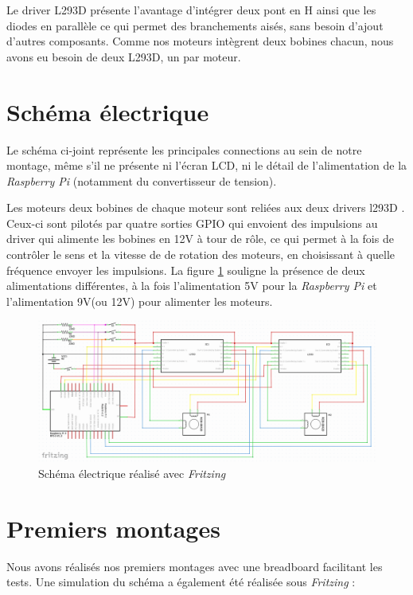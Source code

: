 \documentclass[12pt,a4paper]{report}
\begin{document}
Le driver L293D présente l'avantage d'intégrer deux pont en H ainsi que les diodes en parallèle ce qui permet des branchements aisés, sans besoin d'ajout d'autres composants. Comme nos moteurs intègrent deux bobines chacun, nous avons eu besoin de deux L293D, un par moteur.

\section{Schéma électrique}
Le schéma ci-joint représente les principales connections au sein de notre montage, même s'il ne présente ni l'écran LCD, ni le détail de l'alimentation de la \emph{Raspberry Pi} (notamment du convertisseur de tension).

Les moteurs deux bobines de chaque moteur sont reliées aux deux drivers l293D . Ceux-ci sont pilotés par quatre sorties GPIO qui envoient des impulsions au driver qui alimente les bobines en 12V à tour de rôle, ce qui permet à la fois de contrôler le sens et la vitesse de de rotation des moteurs, en choisissant à quelle fréquence envoyer les impulsions. La figure \ref{schema_elec} souligne la présence de deux alimentations différentes, à la fois l'alimentation 5V pour la \emph{Raspberry Pi} et l'alimentation 9V(ou 12V) pour alimenter les moteurs.
\begin{figure}[!h]
 \center
 \includegraphics[scale=0.33]{../pictures/Sudoku_schema_electrique.png}
 \caption{Schéma électrique réalisé avec \emph{Fritzing}}
 \label{schema_elec}
\end{figure}

\newpage
\section{Premiers montages}
Nous avons réalisés nos premiers montages avec une breadboard facilitant les tests. Une simulation du schéma a également été réalisée sous \emph{Fritzing} :
\end{document}
